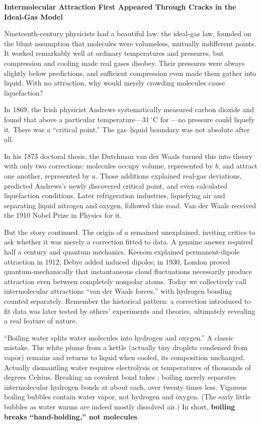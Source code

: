 \begin{zhengju}
\textbf{Intermolecular Attraction First Appeared Through Cracks in the Ideal-Gas Model}

Nineteenth-century physicists had a beautiful law: the ideal-gas law, founded on the blunt assumption that molecules were volumeless, mutually indifferent points. It worked remarkably well at ordinary temperatures and pressures, but compression and cooling made real gases disobey. Their pressures were always slightly below predictions, and sufficient compression even made them gather into liquid. With no attraction, why would merely crowding molecules cause liquefaction?

In 1869, the Irish physicist Andrews systematically measured carbon dioxide and found that above a particular temperature---$31\,^{\circ}\mathrm{C}$ for ---no pressure could liquefy it. There was a ``critical point.'' The gas--liquid boundary was not absolute after all.

In his 1873 doctoral thesis, the Dutchman van der Waals turned this into theory with only two corrections: molecules occupy volume, represented by $b$, and attract one another, represented by $a$. Those additions explained real-gas deviations, predicted Andrews's newly discovered critical point, and even calculated liquefaction conditions. Later refrigeration industries, liquefying air and separating liquid nitrogen and oxygen, followed this road. Van der Waals received the 1910 Nobel Prize in Physics for it.

But the story continued. The origin of $a$ remained unexplained, inviting critics to ask whether it was merely a correction fitted to data. A genuine answer required half a century and quantum mechanics. Keesom explained permanent-dipole attraction in 1912; Debye added induced dipoles; in 1930, London proved quantum-mechanically that instantaneous cloud fluctuations necessarily produce attraction even between completely nonpolar atoms. Today we collectively call intermolecular attractions ``van der Waals forces,'' with hydrogen bonding counted separately. Remember the historical pattern: a correction introduced to fit data was later tested by others' experiments and theories, ultimately revealing a real feature of nature.
\end{zhengju}

\begin{wuqu}
``Boiling water splits water molecules into hydrogen and oxygen.'' A classic mistake. The white plume from a kettle (actually tiny droplets condensed from vapor) remains  and returns to liquid when cooled, its composition unchanged. Actually dismantling water requires electrolysis or temperatures of thousands of degrees Celsius. Breaking an  covalent bond takes ; boiling merely separates intermolecular hydrogen bonds at about  each, over twenty times less. Vigorous boiling bubbles contain water vapor, not hydrogen and oxygen. (The early little bubbles as water warms are indeed mostly dissolved air.) In short, \textbf{boiling breaks ``hand-holding,'' not molecules}.
\end{wuqu}

